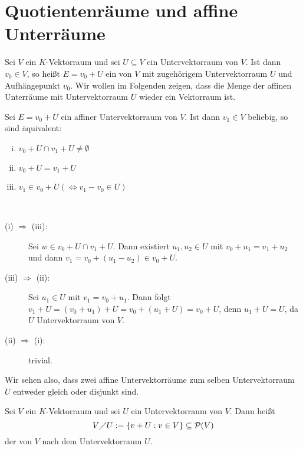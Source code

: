 \section{Quotientenräume und affine Unterräume}
\label{sec:2.11}

Sei $V$ ein $K$-Vektorraum und sei $U \subseteq V$ ein Untervektorraum von $V$.
Ist dann $v_0 \in V$, so heißt $E = v_0 + U$ ein  von $V$ mit zugehörigem Untervektorraum $U$ und Aufhängepunkt $v_0$.
Wir wollen im Folgenden zeigen, dass die Menge der affinen Unterräume mit Untervektorraum $U$ wieder ein Vektorraum ist.

\begin{lemma}
	\label{lemma:11.1}
	Sei $E = v_0 + U$ ein affiner Untervektorraum von $V$.
	Ist dann $v_1 \in V$ beliebig, so sind äquivalent:
	\begin{enumerate}[(i)]
		\item $v_0 + U \cap v_1 + U \neq \emptyset$ 
		\item $v_0 + U = v_1 + U$
		\item $v_1 \in v_0 + U (\Leftrightarrow v_1 - v_0 \in U)$
	\end{enumerate}
\end{lemma}

\begin{beweis}
	\mbox{} \\[-.9cm]
	\begin{description}
		\item[(i) $\Rightarrow$ (iii):] Sei $w \in v_0 + U \cap v_1 + U$.
		Dann existiert $u_1, u_2 \in U$ mit $v_0 + u_1 = v_1 + u_2$ und dann $v_1 = v_0 + (u_1 - u_2) \in v_0 + U$.
		\item[(iii) $\Rightarrow$ (ii):] Sei $u_1 \in U$ mit $v_1 = v_0 + u_1$.
		Dann folgt $v_1 + U = (v_0 + u_1) + U = v_0 + (u_1 + U) = v_0 + U$, denn $u_1 + U = U$, da $U$ Untervektorraum von $V$.
		\item[(ii) $\Rightarrow$ (i):] trivial. \qedhere
	\end{description}
\end{beweis}

Wir sehen also, dass zwei affine Untervektorräume zum selben Untervektorraum $U$ entweder gleich oder disjunkt sind.

\begin{definition}[Quotientenraum]
	\label{def:11.2}
	Sei $V$ ein $K$-Vektorraum und sei $U$ ein Untervektorraum von $V$.
	Dann heißt
	\[
		V \diagup U := \{v + U : v \in V\} \subseteq \operatorname{\mathcal{P}}(V)
	\]
	der  von $V$ nach dem Untervektorraum $U$.
\end{definition}

